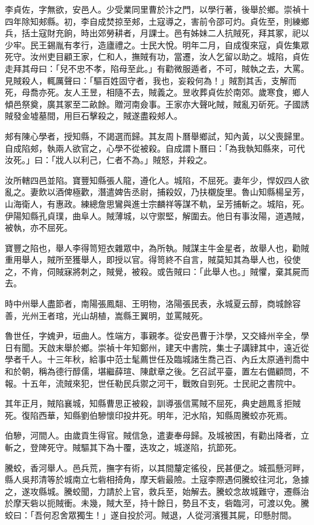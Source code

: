 \begin{pinyinscope}
李貞佐，字無欲，安邑人。少受業同里曹於汴之門，以學行著，後舉於鄉。崇禎十四年除知郟縣。初，李自成焚掠至郟，土寇導之，害前令邵可灼。貞佐至，則練鄉兵，括土寇財充餉，時出郊勞耕者，月課士。邑有姊妹二人抗賊死，拜其冢，祀以少牢。民王錫胤有孝行，造廬禮之。士民大悅。明年二月，自成復來寇，貞佐集眾死守。汝州吏目顧王家，仁和人，撫賊有功，當遷，汝人乞留以助之。城陷，貞佐走拜其母曰：「兒不忠不孝，陷母至此。」有勸微服遁者，不可，賊執之去，大罵。見賊殺人，輒厲聲曰：「驅百姓固守者，我也，妄殺何為！」賊割其舌，支解而死，母喬亦死。友人王昱，相隨不去，賊義之。昱收葬貞佐於南郊。歲寒食，鄉人傾邑祭奠，廣其冢至二畝餘。贈河南僉事。王家亦大聲叱賊，賊亂刃斫死。子國誘賊發金墟墓間，用巨石擊殺之，賊遂盡殺郟人。

郟有陳心學者，授知縣，不謁選而歸。其友周卜曆舉鄉試，知內黃，以父喪歸里。自成陷郟，執兩人欲官之，心學不從被殺。自成謂卜曆曰：「為我執知縣來，可代汝死。」曰：「戕人以利己，仁者不為。」賊怒，并殺之。

汝所轄四邑並陷。寶豐知縣張人龍，遵化人。城陷，不屈死。妻年少，悍奴四人欲亂之。妻飲以酒俾極歡，潛遣婢告丞尉，捕殺奴，乃扶櫬旋里。魯山知縣楊呈芳，山海衛人，有惠政。練總詹思鸞與進士宗麟祥等謀不軌，呈芳捕斬之。城陷，死。伊陽知縣孔貞璞，曲阜人。賊薄城，以守禦堅，解圍去。他日有事汝陽，道遇賊，被執，亦不屈死。

寶豐之陷也，舉人李得笥短衣雜眾中，為所執。賊謀主牛金星者，故舉人也，勸賊重用舉人，賊所至獲舉人，即授以官。得笥終不自言，賊莫知其為舉人也，役使之，不肯，伺賊寐將刺之，賊覺，被殺。或告賊曰：「此舉人也。」賊懼，棄其屍而去。

時中州舉人盡節者，南陽張鳳翷、王明物，洛陽張民表，永城夏云醇，商城餘容善，光州王者琯，光山胡植，嵩縣王翼明，並罵賊死。

魯世任，字媿尹，垣曲人。性端方，事親孝。從安邑曹于汴學，又交絳州辛全，學日有聞。天啟末舉於鄉。崇禎十年知鄭州，建天中書院，集士子講肄其中，遠近從學者千人。十三年秋，給事中范士髦薦世任及臨城諸生喬己百、內丘太原通判喬中和於朝，稱為德行醇儒，堪繼薛瑄、陳獻章之後。乞召試平臺，置左右備顧問，不報。十五年，流賊來犯，世任勒民兵禦之河干，戰敗自剄死。士民祀之書院中。

其年正月，賊陷襄城，知縣曹思正被殺，訓導張信罵賊不屈死，典史趙鳳豸拒賊死。復陷西華，知縣劉伯驂懷印投井死。明年，汜水陷，知縣周騰蛟亦死焉。

伯驂，河間人。由歲貢生得官。賊信急，遣妻奉母歸。及城被困，有勸出降者，立斬之，登陴死守。賊驅其下為十覆，迭攻之，城遂陷，抗節死。

騰蛟，香河舉人。邑兵荒，撫字有術，以其間釐定徭役，民甚便之。城孤懸河畔，縣人吳邦清等於城南立七砦相掎角，摩天砦最險。土寇李際遇伺騰蛟往河北，急據之，遂攻縣城。騰蛟聞，力請於上官，救兵至，始解去。騰蛟念故城難守，遷縣治於摩天砦以扼賊衝。未幾，賊大至，持十餘日，勢且不支，砦臨河，可渡以免。騰蛟曰：「吾何忍舍眾獨生！」遂自投於河。賊退，人從河濱獲其屍，印懸肘間。


\end{pinyinscope}
